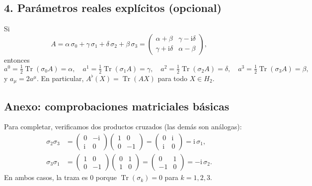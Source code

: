 \documentclass[12pt]{article}
\newcommand{\Tr}{\operatorname{Tr}}
\newcommand{\I}{\mathrm{i}} %
\begin{document}
\subsection*{4. Parámetros reales explícitos (opcional)}
Si
\[
A=\alpha\,\sigma_0+\gamma\,\sigma_1+\delta\,\sigma_2+\beta\,\sigma_3
=
\begin{pmatrix}
\alpha+\beta & \gamma-\I\delta\\[2pt]
\gamma+\I\delta & \alpha-\beta
\end{pmatrix},
\]
entonces
\[
a^0=\tfrac12\Tr(\sigma_0A)=\alpha,\quad
a^1=\tfrac12\Tr(\sigma_1A)=\gamma,\quad
a^2=\tfrac12\Tr(\sigma_2A)=\delta,\quad
a^3=\tfrac12\Tr(\sigma_3A)=\beta,
\]
y $a_\mu=2a^\mu$. En particular, $A^\flat(X)=\Tr(AX)$ para todo $X\in H_2$.

\subsection*{Anexo: comprobaciones matriciales básicas}
Para completar, verificamos dos productos cruzados (las demás son análogas):
\begin{align*}
\sigma_2\sigma_3&=
\begin{pmatrix}0&-\I\\ \I&0\end{pmatrix}
\begin{pmatrix}1&0\\ 0&-1\end{pmatrix}
=
\begin{pmatrix}0&\I\\ \I&0\end{pmatrix}
=\I\,\sigma_1,
\\[2pt]
\sigma_3\sigma_1&=
\begin{pmatrix}1&0\\ 0&-1\end{pmatrix}
\begin{pmatrix}0&1\\ 1&0\end{pmatrix}
=
\begin{pmatrix}0&1\\ -1&0\end{pmatrix}
=-\I\,\sigma_2.
\end{align*}
En ambos casos, la traza es $0$ porque $\Tr(\sigma_k)=0$ para $k=1,2,3$.
\end{document}
